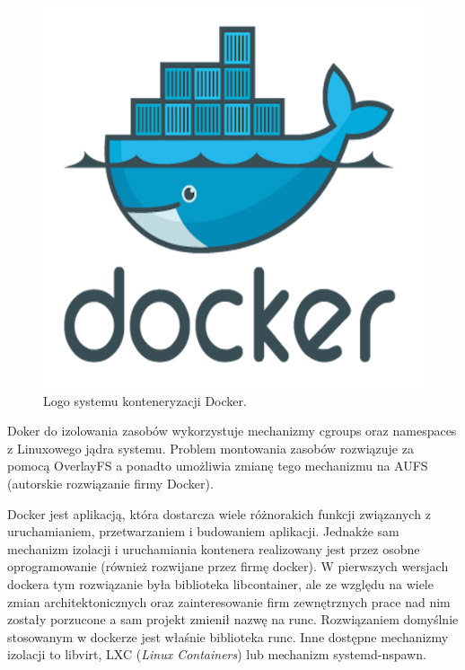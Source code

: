 \documentclass[10pt,a4paper,titlepage,twoside]{report}
\begin{document}
\begin{figure}[ht!]
	\centering
	\includegraphics[scale=0.7]{pics/docker.png}
	\caption{Logo systemu konteneryzacji Docker.}
	\label{docker_logo}
\end{figure}

Doker do izolowania zasobów wykorzystuje mechanizmy cgroups oraz namespaces z Linuxowego jądra systemu. Problem montowania zasobów rozwiązuje za pomocą OverlayFS a ponadto umożliwia zmianę tego mechanizmu na AUFS (autorskie rozwiązanie firmy Docker).

Docker jest aplikacją, która dostarcza wiele różnorakich funkcji związanych z uruchamianiem, przetwarzaniem i budowaniem aplikacji. Jednakże sam mechanizm izolacji i uruchamiania kontenera realizowany jest przez osobne oprogramowanie (również rozwijane przez firmę docker). W pierwszych wersjach dockera tym rozwiązanie była biblioteka libcontainer, ale ze względu na wiele zmian architektonicznych oraz zainteresowanie firm zewnętrznych prace nad nim zostały porzucone a sam projekt zmienił nazwę na runc. Rozwiązaniem domyślnie stosowanym w dockerze jest właśnie biblioteka runc. Inne dostępne mechanizmy izolacji to libvirt, LXC (\textit{Linux Containers}) lub mechanizm systemd-nspawn.
\end{document}
